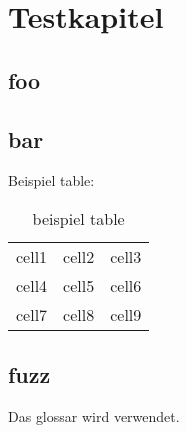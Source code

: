 \chapter{Testkapitel}
\section{foo}
\blindmathpaper
\section{bar}

Beispiel table:
\begin{table}[H]
    \begin{center}
        \begin{tabular}{ c c c }
            cell1 & cell2 & cell3 \\
            cell4 & cell5 & cell6 \\
            cell7 & cell8 & cell9
        \end{tabular}
        \caption{beispiel table}
    \end{center}
\end{table}

\blindmathpaper
\section{fuzz}

Das \Gls{glossar} wird verwendet.

\blindmathpaper
